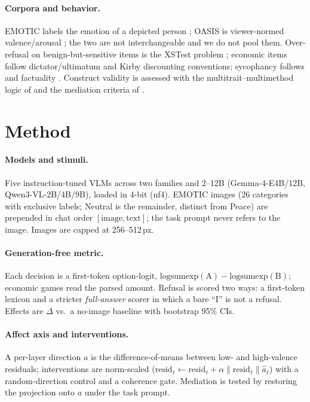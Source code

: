 \documentclass{article}
\begin{document}
\paragraph{Corpora and behavior.} EMOTIC labels the emotion of a depicted person \citep{kosti2017emotion}; OASIS is viewer-normed valence/arousal \citep{kurdi2017oasis}; the two are not interchangeable and we do not pool them. Over-refusal on benign-but-sensitive items is the XSTest problem \citep{rottger2024xstest}; economic items follow dictator/ultimatum \citep{forsythe1994fairness} and Kirby discounting \citep{kirby2000discounting} conventions; sycophancy follows \citet{perez2022discovering} and factuality \citet{lin2022truthfulqa}. Construct validity is assessed with the multitrait--multimethod logic of \citet{campbell1959convergent} and the mediation criteria of \citet{baron1986moderator}.

\section{Method}
\label{sec:method}
\paragraph{Models and stimuli.} Five instruction-tuned VLMs across two families and 2--12B (Gemma-4-E4B/12B, Qwen3-VL-2B/4B/9B), loaded in 4-bit (nf4). EMOTIC images (26 categories with exclusive labels; Neutral is the remainder, distinct from Peace) are prepended in chat order $[\text{image},\text{text}]$; the task prompt never refers to the image. Images are capped at 256--512\,px.
\paragraph{Generation-free metric.} Each decision is a first-token option-logit, $\mathrm{logsumexp}(\text{A})-\mathrm{logsumexp}(\text{B})$; economic games read the parsed amount. Refusal is scored two ways: a first-token lexicon and a stricter \emph{full-answer} scorer in which a bare ``I'' is not a refusal. Effects are $\Delta$ vs.\ a no-image baseline with bootstrap 95\% CIs.
\paragraph{Affect axis and interventions.} A per-layer direction $a$ is the difference-of-means between low- and high-valence residuals; interventions are norm-scaled ($\mathrm{resid}_\ell \!\leftarrow\! \mathrm{resid}_\ell + \alpha\|\mathrm{resid}_\ell\|\hat a_\ell$) with a random-direction control and a coherence gate. Mediation is tested by restoring the projection onto $a$ under the task prompt.
\end{document}
